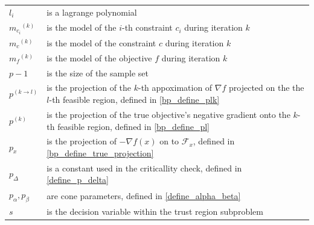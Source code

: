 \documentclass{article}
\theoremstyle{case}
\newcommand{\mcik}{{{m}_{c_i}}^{(k)}}
\newcommand{\mck}{{{m}_{c}}^{(k)}}
\newcommand{\mfk}{{{m}_f}^{(k)}}
\begin{document}
\begin{longtable}{| p{} | p{} |}
$l_i$ & is a lagrange polynomial \\ %
$\mcik$ & is the model of the $i$-th constraint $c_i$ during iteration $k$\\ %
$\mck$ & is the model of the constraint $c$ during iteration $k$\\ %
$\mfk$ & is the model of the objective $f$ during iteration $k$\\ %
$p-1$ & is the size of the sample set \\ %
$p^{(k \to l)}$ & is the projection of the $k$-th appoximation of $\nabla f$ projected on the the $l$-th feasible region, defined in \cref{bp_define_plk} \\ %
$p^{(k)}$ & is the projection of the true objective's negative gradient onto the $k$-th feasible region, defined in \cref{bp_define_pl} \\ %
$p_x$ & is the projection of $-\nabla f(x)$ on to $\mathcal F_x$, defined in \cref{bp_define_true_projection} \\ %
$p_{\Delta}$ & is a constant used in the criticallity check, defined in  \cref{define_p_delta} \\ %
$p_{\alpha}, p_{\beta}$ & are cone parameters, defined in \cref{define_alpha_beta} \\ %
$s$ & is the decision variable within the trust region subproblem \\ %

\end{longtable}
\end{document}

